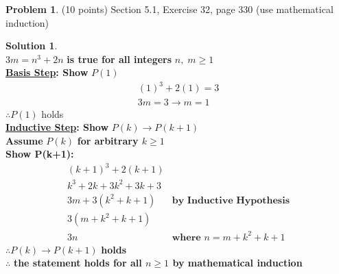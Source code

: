 \documentclass{article}
\theoremstyle{definition}
\newtheorem{problem}{Problem}
\newtheorem*{solution}{Solution}
\begin{document}
\begin{problem} (10 points)
Section 5.1, Exercise 32, page 330 (use mathematical induction)
\end{problem}
\begin{solution} \ \\
$3m = n^3+2n$ \textbf{is true for all integers} $n,\;m \ge 1 $ \\
\textbf{\underline{Basis Step}: Show} $P(1)$ \\
\begin{align*}
  (1)^3+2(1) = 3\\
  3m = 3 \rightarrow m = 1
\end{align*}
$\therefore P(1)$ holds \\
\textbf{\underline{Inductive Step}: Show } $P(k) \rightarrow P(k+1)$ \\
\textbf{Assume} $P(k)$ \textbf{for arbitrary $k \ge 1 $} \\
\textbf{Show P(k+1):} \\
\begin{align*}
  (k+1)^3 + 2(k+1) \\
   k^3 + 2k + 3k^2 + 3k + 3 \\
   3m + 3(k^2 + k + 1) &\textbf{by Inductive Hypothesis} \\
   3(m + k^2 + k + 1) \\
   3n\quad &\textbf{where $n=m + k^2 + k + 1$}
\end{align*}
$\therefore P(k) \rightarrow P(k+1)$ \textbf{holds}\\
$\therefore$ \textbf{the statement holds for all $n \ge 1 $ by mathematical induction} 
\end{solution}
\end{document}
